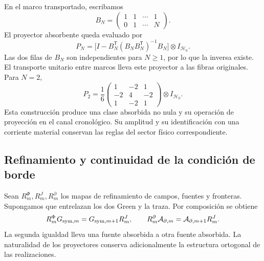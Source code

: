 En el marco transportado, escribamos
\[
 B_N=\begin{pmatrix}1&1&\cdots&1\\0&1&\cdots&N\end{pmatrix}.
\]
El proyector absorbente queda evaluado por
\begin{equation}
 P_N=\bigl[I-B_N^{\mathsf T}(B_NB_N^{\mathsf T})^{-1}B_N\bigr]
       \otimes I_{\mathcal H_0}.
 \label{vii:eq:proyector-momentos-cronologicos}
\end{equation}
Las dos filas de \(B_N\) son independientes para \(N\geq1\), por lo
que la inversa existe. El transporte unitario entre marcos lleva este
proyector a las fibras originales. Para \(N=2\),
\[
 P_2=\frac16
 \begin{pmatrix}1&-2&1\\-2&4&-2\\1&-2&1\end{pmatrix}
 \otimes I_{\mathcal H_0}.
\]
Esta construcción produce una clase absorbida no nula y su operación de
proyección en el canal cronológico. Su amplitud y su identificación con una
corriente material conservan las reglas del sector físico correspondiente.

\subsection{Refinamiento y continuidad de la condición de borde}
\label{vii:subsec:refinamiento-absorcion}

Sean \(R_m^\Phi,R_m^J,R_m^\partial\) los mapas de refinamiento de
campos, fuentes y fronteras. Supongamos que entrelazan los dos Green y la
traza. Por composición se obtiene
\begin{equation}
 R_m^\Phi G_{{\rm sym},m}=G_{{\rm sym},m+1}R_m^J,\qquad
 R_m^\partial\mathcal A_{\partial,m}
 =\mathcal A_{\partial,m+1}R_m^J.
 \label{vii:eq:refinamiento-lectura-absorcion}
\end{equation}
La segunda igualdad lleva una fuente absorbida a otra fuente absorbida.
La naturalidad de los proyectores conserva adicionalmente la estructura
ortogonal de las realizaciones.

